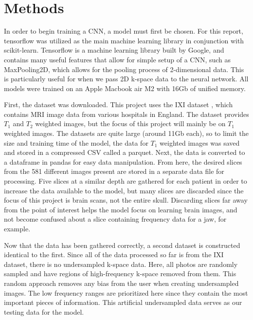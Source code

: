\documentclass[14pt]{extreport}
\begin{document}
    \section*{Methods}
        In order to begin training a CNN, a model must first be chosen. For this report, tensorflow was utilized as the main machine learning library in conjunction with scikit-learn. Tensorflow is a machine learning library built by Google, and contains many useful features that allow for simple setup of a CNN, such as MaxPooling2D, which allows for the pooling process of 2-dimensional data. This is particularly useful for when we pass 2D k-space data to the neural network. All models were trained on an Apple Macbook air M2 with 16Gb of unified memory.

        First, the dataset was downloaded. This project uses the IXI dataset \cite{IXI_Dataset}, which contains MRI image data from various hospitals in England. The dataset provides $T_1$ and $T_2$ weighted images, but the focus of this project will mainly be on $T_1$ weighted images. The datasets are quite large (around 11Gb each), so to limit the size and training time of the model, the data for $T_1$ weighted images was saved and stored in a compressed CSV called a parquet. Next, the data is converted to a dataframe in pandas for easy data manipulation. From here, the desired slices from the 581 different images present are stored in a separate data file for processing. Five slices at a similar depth are gathered for each patient in order to increase the data available to the model, but many slices are discarded since the focus of this project is brain scans, not the entire skull. Discarding slices far away from the point of interest helps the model focus on learning brain images, and not become confused about a slice containing frequency data for a jaw, for example. 

        Now that the data has been gathered correctly, a second dataset is constructed identical to the first. Since all of the data processed so far is from the IXI dataset, there is no undersampled k-space data. Here, all photos are randomly sampled and have regions of high-frequency k-space removed from them. This random approach removes any bias from the user when creating undersampled images. The low frequency ranges are prioritized here since they contain the most important pieces of information. This artificial undersampled data serves as our testing data for the model. 
\end{document}
